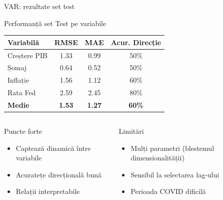 \documentclass[9pt, aspectratio=169, t]{beamer}
\begin{document}
\begin{frame}{VAR: rezultate set test}
    \vspace{-0.1cm}
    {\footnotesize
    \begin{block}{Performanță set Test pe variabile}
        \begin{center}
        \begin{tabular}{lccc}
            \toprule
            \textbf{Variabilă} & \textbf{RMSE} & \textbf{MAE} & \textbf{Acur. Direcție} \\
            \midrule
            Creștere PIB & 1.33 & 0.99 & 50\% \\
            Șomaj & 0.64 & 0.52 & 50\% \\
            Inflație & 1.56 & 1.12 & 60\% \\
            Rata Fed & 2.59 & 2.45 & 80\% \\
            \midrule
            \textbf{Medie} & \textbf{1.53} & \textbf{1.27} & \textbf{60\%} \\
            \bottomrule
        \end{tabular}
        \end{center}
    \end{block}

    \vspace{0.05cm}

    \begin{columns}[T]
        \begin{exampleblock}{Puncte forte}
            \begin{itemize}\setlength{\itemsep}{0pt}
                \item Captează dinamică între variabile
                \item Acuratețe direcțională bună
                \item Relații interpretabile
            \end{itemize}
        \end{exampleblock}

        \begin{alertblock}{Limitări}
            \begin{itemize}\setlength{\itemsep}{0pt}
                \item Mulți parametri (blestemul dimensionalității)
                \item Sensibil la selectarea lag-ului
                \item Perioada COVID dificilă
            \end{itemize}
        \end{alertblock}
    \end{columns}
    }
\end{frame}
\end{document}
